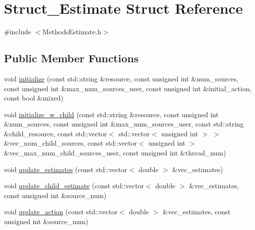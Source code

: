 \hypertarget{structStruct__Estimate}{\section{Struct\-\_\-\-Estimate Struct Reference}
\label{structStruct__Estimate}
}


{\ttfamily \#include $<$Methods\-Estimate.\-h$>$}

\subsection*{Public Member Functions}
\begin{DoxyCompactItemize}
\item 
void \hyperlink{structStruct__Estimate_a86b258312b0cbd9a988a8b8c80f72fb4}{initialize} (const std\-::string \&resource, const unsigned int \&num\-\_\-sources, const unsigned int \&max\-\_\-num\-\_\-sources\-\_\-user, const unsigned int \&initial\-\_\-action, const bool \&mixed)
\item 
void \hyperlink{structStruct__Estimate_a14707ec3b60745fc143894f8b335e2eb}{initialize\-\_\-w\-\_\-child} (const std\-::string \&resource, const unsigned int \&num\-\_\-sources, const unsigned int \&max\-\_\-num\-\_\-sources\-\_\-user, const std\-::string \&child\-\_\-resource, const std\-::vector$<$ std\-::vector$<$ unsigned int $>$ $>$ \&vec\-\_\-num\-\_\-child\-\_\-sources, const std\-::vector$<$ unsigned int $>$ \&vec\-\_\-max\-\_\-num\-\_\-child\-\_\-sources\-\_\-user, const unsigned int \&thread\-\_\-num)
\item 
void \hyperlink{structStruct__Estimate_a1319536e0446f7017c1551375b7bd6bc}{update\-\_\-estimates} (const std\-::vector$<$ double $>$ \&vec\-\_\-estimates)
\item 
void \hyperlink{structStruct__Estimate_aafbf20ed9ca283b3d8e2da6a2d44a43e}{update\-\_\-child\-\_\-estimate} (const std\-::vector$<$ double $>$ \&vec\-\_\-estimates, const unsigned int \&source\-\_\-num)
\item 
void \hyperlink{structStruct__Estimate_a304683373750daa1d4409658ab5e3164}{update\-\_\-action} (const std\-::vector$<$ double $>$ \&vec\-\_\-estimates, const unsigned int \&source\-\_\-num)
\end{DoxyCompactItemize}
